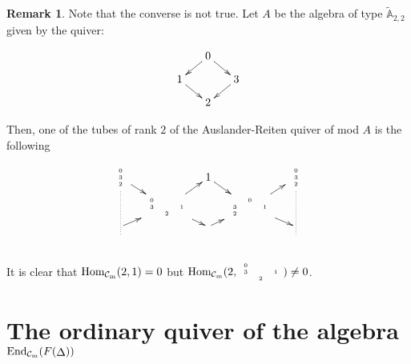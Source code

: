 \documentclass{amsart}
\theoremstyle{plain}
\theoremstyle{definition}
\newtheorem{obs}[teo]{Remark}
\begin{document}
\begin{obs}
Note that the converse is not true.  Let $A$ be the algebra  of type $\widetilde{\mathbb{A}}_{2,2}$ given by the quiver:

$$\xymatrix@R=.3cm@C=.5cm{  & 0  \ar[dr] \ar[dl]& \\
1\ar[rd] && 3 \ar[ld] \\
& 2 & }$$

Then, one of the tubes of rank $2$ of the Auslander-Reiten quiver of mod  $A$ is the following

$$\xymatrix@R=.08cm@C=.3cm{ \tiny{\begin{array}{c}
               0 \\
               3\\
               2
             \end{array} } \ar[rd] \ar@{.}[ddd] &&   1  \ar[dr] && \tiny{\begin{array}{c}
               0 \\
               3\\
               2
             \end{array} }  \ar@{.}[ddd] \\
             &  \tiny{\begin{array}{ccc}
               0  && \\
               3 && 1\\
               &2&
             \end{array} }  \ar[ur] \ar[dr] && \tiny{\begin{array}{ccc}
                 &0& \\
               3 && 1\\
               2 &&
             \end{array} } \ar[ru] \ar[dr]  & \\
             \ar[ru]&& \ar[ru]&& \\
             &&&&\\
              &&&&}$$

It is clear that ${\mathop{\rm Hom_{\mathcal{C}_m}}\nolimits}(2,1)=0$  but  ${\mathop{\rm Hom_{\mathcal{C}_m}}\nolimits}(2, \tiny{\begin{array}{ccc}
               0  && \\
               3 && 1\\
               &2&
             \end{array} })\neq 0$.
\end{obs}

\section{The ordinary quiver of the algebra ${\mathop{\rm End_{\mathcal{C}_m}}\nolimits}(F({\mathop{\Delta}\nolimits}))$ }
\end{document}
